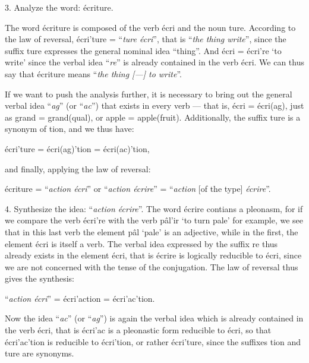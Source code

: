 {   3. Analyze the word: \textup{écriture}.

   The word \textup{écriture} is composed of the verb
   \textup{écri} and the noun \textup{ture}. According to the law of
   reversal, \textup{écri'ture} = ``\emph{ture écri}'', that is
   ``\emph{the thing write}'', since the suffix \textup{ture} expresses
   the general nominal idea ``thing''. And \textup{écri} =
   \textup{écri're} `to write' since the verbal idea ``\emph{re}''
   is already contained in the verb \textup{écri}. We can thus say
   that \textup{écriture} means ``\emph{the thing [---] to
     write}''.

   If we want to push the analysis further, it is necessary to bring
   out the general verbal idea ``\emph{ag}'' (or ``\emph{ac}'') that
   exists in every verb --- that is, \textup{écri} =
   \textup{écri(ag)}, just as \textup{grand} =
    \textup{grand(qual)}, or \textup{apple} =
    \textup{apple(fruit)}. Additionally, the suffix \textup{ture} is a
    synonym of \textup{tion}, and we thus have:

    {\centering
      \textup{écri'ture} = \textup{écri(ag)'tion} =
      \textup{écri(ac)'tion},\par
    }

    \noindent
    and finally, applying the law of reversal:
    
    \noindent
    {\centering
      \textup{écriture} = ``\emph{action écri}'' or ``\emph{action écrire}''
      = ``\emph{action} [of the type] \emph{écrire}''.\par
    }

    4. Synthesize the idea: ``\emph{action écrire}''. The word
    \textup{écrire} contians a pleonasm, for if we compare the verb
    \textup{écri're} with the verb \textup{p\^al'ir} `to turn pale'
    for example, we see that in this last verb the element
    \textup{p\^al} `pale' is an adjective, while in the first, the
    element \textup{écri} is itself a verb.  The verbal idea
    expressed by the suffix \textup{re} thus already exists in the
    element \textup{écri}, that is \textup{écrire} is logically
    reducible to \textup{écri}, since we are not concerned with the
    tense of the conjugation. The law of reversal thus gives the
    synthesis:

    {\centering
      ``\emph{action écri}'' = \textup{écri'action} =
      \textup{écri'ac’tion}.\par
    }

    Now the idea ``\emph{ac}'' (or ``\emph{ag}'') is again the verbal
    idea which is already contained in the verb \textup{écri}, that
    is \textup{écri'ac} is a pleonastic form reducible to
    \textup{écri}, so that \textup{écri'ac'tion} is reducible to
    \textup{écri'tion}, or rather \textup{écri'ture}, since the
    suffixes \textup{tion} and \textup{ture} are synonyms.

}
